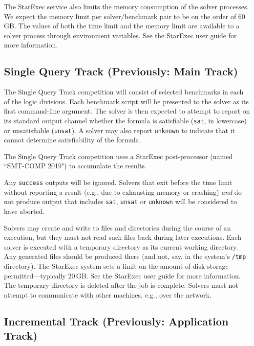 \documentclass[12pt]{article}
\newcommand{\main}{Single Query\xspace}
\begin{document}
The StarExec service also limits the memory consumption of the solver
processes.  We expect the memory limit per solver/benchmark pair to be
on the order of 60\,GB.  The values of both the time limit and the
memory limit are available to a solver process through environment
variables.  See the StarExec user guide for more information.

\subsection{\main Track (Previously: Main Track)}
\label{sec:exec:single}

The \main Track competition will consist of selected benchmarks in each
of the logic divisions.  Each benchmark script will be presented to
the solver as its first command-line argument.  The solver is then
expected to attempt to report on its standard output channel whether
the formula is satisfiable (\texttt{sat}, in lowercase) or
unsatisfiable (\texttt{unsat}).  A solver may also report
\texttt{unknown} to indicate that it cannot determine satisfiability
of the formula.

The \main Track competition uses a StarExec post-processor (named
``SMT-COMP 2019") to accumulate the results.

%
Any \texttt{success} outputs will be ignored.  Solvers that exit
before the time limit without reporting a result (e.g., due to
exhausting memory or crashing) \emph{and} do not produce output that
includes \texttt{sat}, \texttt{unsat} or \texttt{unknown} will be
considered to have aborted.

%
Solvers may create and write to files and directories during the
course of an execution, but they must not read such files back during
later executions.  Each solver is executed with a temporary directory
as its current working directory.  Any generated files should be
produced there (and not, say, in the system's \texttt{/tmp}
directory).  The StarExec system sets a limit on the amount of disk
storage permitted---typically 20\,GB.  See the StarExec user guide for
more information.  The temporary directory is deleted after the job is
complete.  Solvers must not attempt to communicate with other
machines, e.g., over the network.

\subsection{Incremental Track (Previously: Application Track)}
\end{document}

